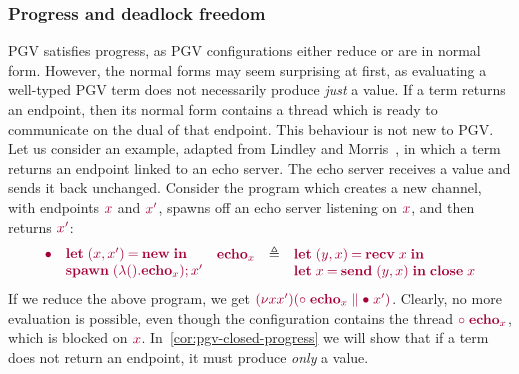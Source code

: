 \documentclass[main.tex]{subfiles}
\begin{document}
\subsubsection*{Progress and deadlock freedom}
PGV satisfies progress, as PGV configurations either reduce or are in normal form. However, the normal forms may seem surprising at first, as evaluating a well-typed PGV term does not necessarily produce \emph{just} a value. If a term returns an endpoint, then its normal form contains a thread which is ready to communicate on the dual of that endpoint. This behaviour is not new to PGV. Let us consider an example, adapted from Lindley and Morris~\cite{lindleymorris15}, in which a term returns an endpoint linked to an echo server. The echo server receives a value and sends it back unchanged. Consider the program which creates a new channel, with endpoints $\tm{x}$ and $\tm{x'}$, spawns off an echo server listening on $\tm{x}$, and then returns $\tm{x'}$:
\[
  \begin{array}{ll}
    \tm{\main}
    & \tm{\letpair{x}{x'}{\new}{}}
    \\
    & \tm{\andthen{\spawn\;(\lambda\unit.\echo_{x})}{x'}}
  \end{array}
  \hfill
  \begin{array}{lcl}
    \tm{\echo_x}
    & \defeq
    & \tm{\letpair{y}{x}{\recv\;{x}}{}}
    \\
    &
    & \tm{\letbind{x}{\send\;\pair{y}{x}}{\close\;x}}
  \end{array}
  \hfill
\]
If we reduce the above program, we get $\tm{\res{x}{x'}{(\ppar{\child\;\echo_{x}}{\main\;x'})}}$. Clearly, no more evaluation is possible, even though the configuration contains the thread $\tm{\child\;\echo_{x}}$, which is blocked on $\tm{x}$. In~\cref{cor:pgv-closed-progress} we will show that if a term does not return an endpoint, it must produce \emph{only} a value.
\end{document}
